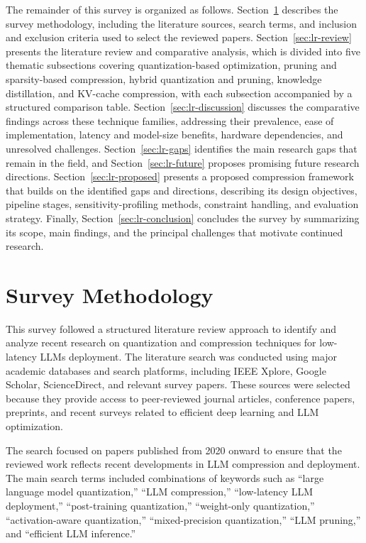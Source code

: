 The remainder of this survey is organized as follows. Section~\ref{sec:lr-method} describes the survey methodology, including the literature sources, search terms, and inclusion and exclusion criteria used to select the reviewed papers. Section~\ref{sec:lr-review} presents the literature review and comparative analysis, which is divided into five thematic subsections covering quantization-based optimization, pruning and sparsity-based compression, hybrid quantization and pruning, knowledge distillation, and KV-cache compression, with each subsection accompanied by a structured comparison table. Section~\ref{sec:lr-discussion} discusses the comparative findings across these technique families, addressing their prevalence, ease of implementation, latency and model-size benefits, hardware dependencies, and unresolved challenges. Section~\ref{sec:lr-gaps} identifies the main research gaps that remain in the field, and Section~\ref{sec:lr-future} proposes promising future research directions. Section~\ref{sec:lr-proposed} presents a proposed compression framework that builds on the identified gaps and directions, describing its design objectives, pipeline stages, sensitivity-profiling methods, constraint handling, and evaluation strategy. Finally, Section~\ref{sec:lr-conclusion} concludes the survey by summarizing its scope, main findings, and the principal challenges that motivate continued research.

\section{Survey Methodology}
\label{sec:lr-method}

This survey followed a structured literature review approach to identify and analyze recent research on quantization and compression techniques for low-latency LLMs deployment. The literature search was conducted using major academic databases and search platforms, including IEEE Xplore, Google Scholar, ScienceDirect, and relevant survey papers. These sources were selected because they provide access to peer-reviewed journal articles, conference papers, preprints, and recent surveys related to efficient deep learning and LLM optimization.

The search focused on papers published from 2020 onward to ensure that the reviewed work reflects recent developments in LLM compression and deployment. The main search terms included combinations of keywords such as ``large language model quantization,'' ``LLM compression,'' ``low-latency LLM deployment,'' ``post-training quantization,'' ``weight-only quantization,'' ``activation-aware quantization,'' ``mixed-precision quantization,'' ``LLM pruning,'' and ``efficient LLM inference.''

